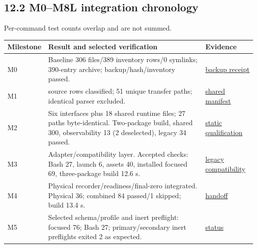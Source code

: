 \documentclass[
  10pt,
  letterpaper,
]{article}
\newcounter{none} %
\begin{document}
\subsection{12.2 M0--M8L integration chronology}\label{m0m8l-integration-chronology}

Per-command test counts overlap and are not summed.

{\def\LTcaptype{none} %
\begin{longtable}[]{@{}
  >{\raggedright\arraybackslash}p{}
  >{\raggedright\arraybackslash}p{}
  >{\raggedright\arraybackslash}p{}@{}}
\toprule\noalign{}
\begin{minipage}[b]{\linewidth}\raggedright
Milestone
\end{minipage} & \begin{minipage}[b]{\linewidth}\raggedright
Result and selected verification
\end{minipage} & \begin{minipage}[b]{\linewidth}\raggedright
Evidence
\end{minipage} \\
\midrule\noalign{}
\endhead
\bottomrule\noalign{}
\endlastfoot
M0 & Baseline 306 files/389 inventory rows/0 symlinks; 390-entry archive; backup/hash/inventory passed. & \href{validation/phase_09_snapshot_backup_receipt.md}{backup receipt} \\
M1 & 52 source rows classified; 51 unique transfer paths; identical parser excluded. & \href{validation/phase_09_shared_source_manifest.tsv}{shared manifest} \\
M2 & Six interfaces plus 18 shared runtime files; 27 paths byte-identical. Two-package build, shared 300, observability 13 (2 deselected), legacy 34 passed. & \href{validation/phase_09_static_qualification.md}{static qualification} \\
M3 & Adapter/compatibility layer. Accepted checks: Bash 27, launch 6, assets 40, installed focused 69, three-package build 12.6 s. & \href{validation/phase_09_legacy_compatibility.md}{legacy compatibility} \\
M4 & Physical recorder/readiness/final-zero integrated. Physical 36; combined 84 passed/1 skipped; build 13.4 s. & \href{handoffs/phase_09_handoff.md}{handoff} \\
M5 & Selected schema/profile and inert preflight: focused 76; Bash 27; primary/secondary inert preflights exited 2 as expected. & \href{status/phase_09_status.md}{status} \\

\end{longtable}}
\end{document}
